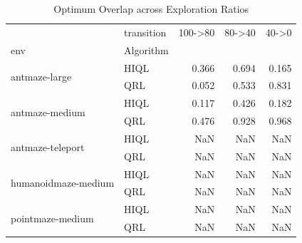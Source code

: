 \begin{table}
\caption{Optimum Overlap across Exploration Ratios}
\label{tab:optimum-overlap-quality}
\begin{tabular}{llrrr}
\toprule
 & transition & 100->80 & 80->40 & 40->0 \\
env & Algorithm &  &  &  \\
\midrule
\multirow[t]{2}{*}{antmaze-large} & HIQL & 0.366 & 0.694 & 0.165 \\
 & QRL & 0.052 & 0.533 & 0.831 \\
\cline{1-5}
\multirow[t]{2}{*}{antmaze-medium} & HIQL & 0.117 & 0.426 & 0.182 \\
 & QRL & 0.476 & 0.928 & 0.968 \\
\cline{1-5}
\multirow[t]{2}{*}{antmaze-teleport} & HIQL & NaN & NaN & NaN \\
 & QRL & NaN & NaN & NaN \\
\cline{1-5}
\multirow[t]{2}{*}{humanoidmaze-medium} & HIQL & NaN & NaN & NaN \\
 & QRL & NaN & NaN & NaN \\
\cline{1-5}
\multirow[t]{2}{*}{pointmaze-medium} & HIQL & NaN & NaN & NaN \\
 & QRL & NaN & NaN & NaN \\
\cline{1-5}
\bottomrule
\end{tabular}
\end{table}
